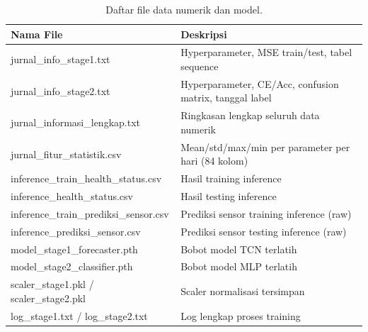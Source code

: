 \documentclass[11pt,a4paper]{article}
\begin{document}
\begin{table}[H]
    \centering
    \caption{Daftar file data numerik dan model.}
    \begin{tabular}{ll}
        \toprule
        \textbf{Nama File} & \textbf{Deskripsi} \\
        \midrule
        jurnal\_info\_stage1.txt & Hyperparameter, MSE train/test, tabel sequence \\
        jurnal\_info\_stage2.txt & Hyperparameter, CE/Acc, confusion matrix, tanggal label \\
        jurnal\_informasi\_lengkap.txt & Ringkasan lengkap seluruh data numerik \\
        jurnal\_fitur\_statistik.csv & Mean/std/max/min per parameter per hari (84 kolom) \\
        inference\_train\_health\_status.csv & Hasil training inference \\
        inference\_health\_status.csv & Hasil testing inference \\
        inference\_train\_prediksi\_sensor.csv & Prediksi sensor training inference (raw) \\
        inference\_prediksi\_sensor.csv & Prediksi sensor testing inference (raw) \\
        model\_stage1\_forecaster.pth & Bobot model TCN terlatih \\
        model\_stage2\_classifier.pth & Bobot model MLP terlatih \\
        scaler\_stage1.pkl / scaler\_stage2.pkl & Scaler normalisasi tersimpan \\
        log\_stage1.txt / log\_stage2.txt & Log lengkap proses training \\
        \bottomrule
    \end{tabular}
\end{table}
\end{document}
